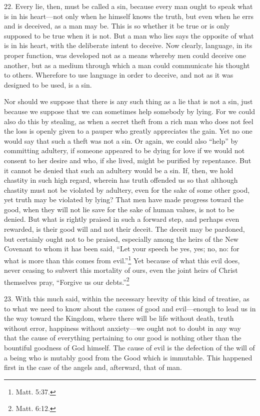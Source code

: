 22. Every lie, then, must be called a sin, because every man ought to speak what is in his heart—not only when he himself knows the truth, but even when he errs and is deceived, as a man may be. This is so whether it be true or is only supposed to be true when it is not. But a man who lies says the opposite of what is in his heart, with the deliberate intent to deceive. Now clearly, language, in its proper function, was developed not as a means whereby men could deceive one another, but as a medium through which a man could communicate his thought to others. Wherefore to use language in order to deceive, and not as it was designed to be used, is a sin.

Nor should we suppose that there is any such thing as a lie that is not a sin, just because we suppose that we can sometimes help somebody by lying. For we could also do this by stealing, as when a secret theft from a rich man who does not feel the loss is openly given to a pauper who greatly appreciates the gain. Yet no one would say that such a theft was not a sin. Or again, we could also ``help'' by committing adultery, if someone appeared to be dying for love if we would not consent to her desire and who, if she lived, might be purified by repentance. But it cannot be denied that such an adultery would be a sin. If, then, we hold chastity in such high regard, wherein has truth offended us so that although chastity must not be violated by adultery, even for the sake of some other good, yet truth may be violated by lying? That men have made progress toward the good, when they will not lie save for the sake of human values, is not to be denied. But what is rightly praised in such a forward step, and perhaps even rewarded, is their good will and not their deceit. The deceit may be pardoned, but certainly ought not to be praised, especially among the heirs of the New Covenant to whom it has been said, ``Let your speech be yes, yes; no, no: for what is more than this comes from evil.''\footnote{Matt. 5:37.} Yet because of what this evil does, never ceasing to subvert this mortality of ours, even the joint heirs of Christ themselves pray, ``Forgive us our debts.''\footnote{Matt. 6:12.}


23. With this much said, within the necessary brevity of this kind of treatise, as to what we need to know about the causes of good and evil—enough to lead us in the way toward the Kingdom, where there will be life without death, truth without error, happiness without anxiety—we ought not to doubt in any way that the cause of everything pertaining to our good is nothing other than the bountiful goodness of God himself. The cause of evil is the defection of the will of a being who is mutably good from the Good which is immutable. This happened first in the case of the angels and, afterward, that of man.

